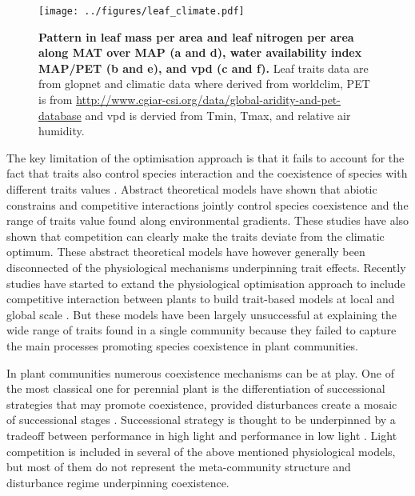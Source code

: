 \documentclass[a4paper,11pt]{article}
\begin{document}
\begin{figure}[H]
\centering
\texttt{[image: ../figures/leaf\_climate.pdf]}
\caption{\textbf{Pattern in leaf mass per area and leaf nitrogen per
  area along MAT over MAP (a and d), water availability index
  MAP/PET (b and e), and  vpd (c and f).} Leaf traits data are from glopnet
\citep{Wright-2004} and climatic data where derived from worldclim,
PET is from
\url{http://www.cgiar-csi.org/data/global-aridity-and-pet-database}
and vpd is dervied from Tmin, Tmax, and relative air humidity.
\label{fig:leafpattern}}
\end{figure}


The key limitation of the optimisation approach is that it fails to account for the fact that
traits also control species interaction and the coexistence of
species with different traits values \citep{Chesson-2018}. 
Abstract theoretical models \citep{Case-2000,Goldberg-2006,Leimar-2008} have shown that abiotic constrains and competitive interactions jointly control species coexistence and the range of traits
value found along environmental gradients. These studies have also shown that competition can
clearly make the traits deviate from the climatic optimum. These
abstract theoretical models have however generally been disconnected
of the physiological mechanisms underpinning trait effects. Recently studies have started to extand the physiological optimisation
approach to include competitive interaction between plants to build trait-based models at local \citep{Farrior-2013} and global
scale \citep[see][]{Sakschewski-2015,Scheiter-2013}. But these models
have been largely unsuccessful at explaining the wide range of traits
found in a single community because they failed to capture the main
processes promoting species coexistence in plant communities.

In plant communities numerous coexistence mechanisms can be at
play. One of the most classical one for perennial plant is the
differentiation of successional strategies that may promote
coexistence, provided disturbances create a mosaic of successional
stages \citep{Falster-2017}. Successional strategy is thought to be underpinned by a tradeoff
between performance in high light and performance in low light \citep{Pacala-1996}. Light
competition is included in several of the above mentioned
physiological models, but most of them do not represent the
meta-community structure and disturbance regime underpinning coexistence.
\end{document}

